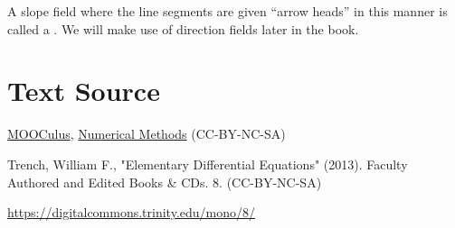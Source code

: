 \documentclass{ximera}
\begin{document}
A slope field where the line segments are given ``arrow heads'' in this manner is called a .  We will make use of direction fields later in the book. 

 
\section*{Text Source}
 
\href{https://github.com/mooculus/calculus}{MOOCulus}, \href{https://github.com/mooculus/calculus/blob/6255bcdf3fae1b17972a7ae4883841bf25464c61/numericalMethods/digInSlopeFieldsAndEulersMethod.tex#L22}{Numerical Methods} (CC-BY-NC-SA)
 
 
Trench, William F., "Elementary Differential Equations" (2013). Faculty Authored and Edited Books \& CDs. 8. (CC-BY-NC-SA)
 
\href{https://digitalcommons.trinity.edu/mono/8/}{https://digitalcommons.trinity.edu/mono/8/}
 
 
\end{document}
